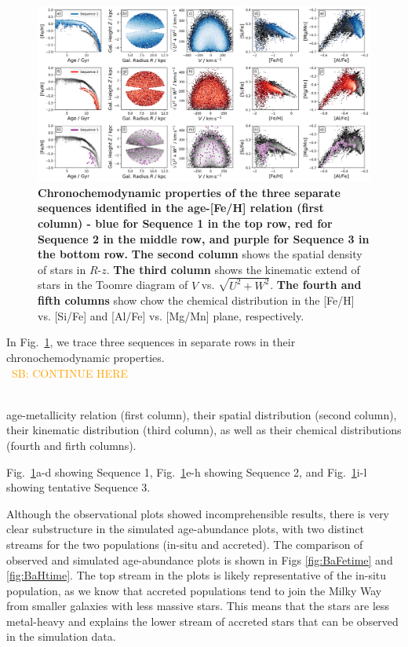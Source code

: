 \documentclass[fleqn,usenatbib]{mnras}
\newcommand{\SB}[1]{{\textcolor{orange}{SB: #1}}}
\begin{document}
\begin{figure}
	\includegraphics[width=\textwidth]{figures/three_sequences_traced.png}
    \caption{
    \textbf{Chronochemodynamic properties of the three separate sequences identified in the age-[Fe/H] relation (first column) - blue for Sequence 1 in the top row, red for Sequence 2 in the middle row, and purple for Sequence 3 in the bottom row.
    }
    \textbf{The second column} shows the spatial density of stars in $R$-$z$.
    \textbf{The third column} shows the kinematic extend of stars in the Toomre diagram of $V$ vs. $\sqrt{U^2+W^2}$.
    \textbf{The fourth and fifth columns} show chow the chemical distribution in the [Fe/H] vs. [Si/Fe] and [Al/Fe] vs. [Mg/Mn] plane, respectively.
    }
    \label{fig:three_sequences_traced}
\end{figure}

In Fig.~\ref{fig:three_sequences_traced}, we trace three sequences in separate rows in their chronochemodynamic properties. \\

$\,$
\SB{CONTINUE HERE}
\\ $\,$

age-metallicity relation (first column), their spatial distribution (second column), their kinematic distribution (third column), as well as their chemical distributions (fourth and firth columns).


Fig.~\ref{fig:three_sequences_traced}a-d showing Sequence 1, Fig.~\ref{fig:three_sequences_traced}e-h showing Sequence 2, and Fig.~\ref{fig:three_sequences_traced}i-l showing tentative Sequence 3.








Although the observational plots showed incomprehensible results, there is very clear substructure in the simulated age-abundance plots, with two distinct streams for the two populations (in-situ and accreted). The comparison of observed and simulated age-abundance plots is shown in Figs \ref{fig:BaFetime} and \ref{fig:BaHtime}. The top stream in the plots is likely representative of the in-situ population, as we know that accreted populations tend to join the Milky Way from smaller galaxies with less massive stars. This means that the stars are less metal-heavy and explains the lower stream of accreted stars that can be observed in the simulation data.
\end{document}
